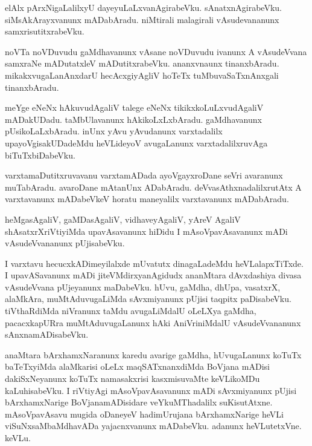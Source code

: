 \documentclass{article}
\begin{document}
\begin{mn}%
elAlx pArxNigaLalilxyU dayeyuLaLxvanAgirabeVku. sAnatxnAgirabeVku. siMsAkArayxvanunx mADabAradu. 
niMtirali malagirali vAsudevananunx samxrisutitxrabeVku.
\end{mn}

\begin{mn}%
noVTa noVDuvudu gaMdhavanunx vAsane noVDuvudu ivanunx A vAsudeVvana samxraNe mADutatxleV 
mADutitxrabeVku. ananxvnaunx tinanxbAradu. mikakxvugaLanAnxdarU hecAcxgiyAgliV hoTeTx 
tuMbuvaSaTxnAnxgali tinanxbAradu.
\end{mn}

\begin{mn}%
meYge eNeNx hAkuvudAgaliV talege eNeNx tikikxkoLuLxvudAgaliV mADakUDadu. taMbUlavanunx 
hAkikoLxLxbAradu. gaMdhavanunx pUsikoLaLxbAradu. inUnx yAvu yAvudanunx varxtadalilx 
upayoVgisakUDadeMdu heVLideyoV avugaLanunx varxtadalilxruvAga biTuTxbiDabeVku.
\end{mn}

\begin{mn}%
varxtamaDutitxruvavanu varxtamADada ayoVgayxroDane seVri avaranunx muTabAradu. avaroDane mAtanUnx 
ADabAradu. deVvasAthxnadalilxrutAtx A varxtavanunx mADabeVkeV horatu maneyalilx varxtavanunx 
mADabAradu.
\end{mn}

\begin{mn}%
heMgasAgaliV, gaMDasAgaliV, vidhaveyAgaliV, yAreV AgaliV shAsatxrXriVtiyiMda upavAsavanunx hiDidu 
I mAsoVpavAsavanunx mADi vAsudeVvananunx pUjisabeVku.
\end{mn}

\begin{mn}%
I varxtavu hecucxkADimeyilalxde mUvatutx dinagaLadeMdu heVLalapxTiTxde. I upavASavanunx mADi 
jiteVMdirxyanAgidudx ananMtara dAvxdashiya divasa vAsudeVvana pUjeyanunx maDabeVku. hUvu, gaMdha, 
dhUpa, vasatxrX, alaMkAra, muMtAduvugaLiMda sAvxmiyanunx pUjisi taqpitx paDisabeVku. tiVthaRdiMda 
niVranunx taMdu avugaLiMdalU oLeLXya gaMdha, pacacxkapURra muMtAduvugaLanunx hAki AniVriniMdalU 
vAsudeVvananunx sAnxnamADisabeVku.
\end{mn}

\begin{mn}%
anaMtara bArxhamxNaranunx karedu avarige  gaMdha, hUvugaLanunx koTuTx baTeTxyiMda alaMkarisi oLeLx 
maqSATxnanxdiMda BoVjana mADisi dakiSxNeyanunx koTuTx namasakxrisi kasxmisuvaMte keVLikoMDu 
kaLuhisabeVku. I riVtiyAgi mAsoVpavAsavanunx mADi sAvxmiyanunx pUjisi bArxhamxNarige 
BoVjanamADisidare veYkuMThadalilx suKisutAtxne. mAsoVpavAsavu mugida oDaneyeV hadimUrujana 
bArxhamxNarige heVLi viSuNxsaMbaMdhavADa yajacnxvanunx mADabeVku. adanunx heVLutetxVne. keVLu.
\end{mn}
\end{document}
